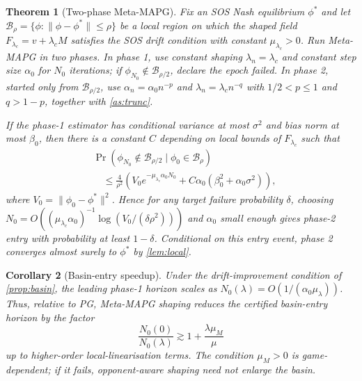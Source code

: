 \documentclass{article}
\theoremstyle{plain}
\newtheorem{theorem}{Theorem}[section]
\newtheorem{corollary}[theorem]{Corollary}
\theoremstyle{definition}
\theoremstyle{remark}
\newcommand{\B}{\mathcal{B}}
\begin{document}
\begin{theorem}[Two-phase Meta-MAPG]\label{thm:two-phase}
Fix an SOS Nash equilibrium $\phi^\ast$ and let $\B_\rho=\{\phi:\|\phi-\phi^\ast\|\le\rho\}$ be a local region on which the shaped field $F_{\lambda_c}=v+\lambda_c M$ satisfies the SOS drift condition with constant $\mu_{\lambda_c}>0$. Run Meta-MAPG in two phases. In phase 1, use constant shaping $\lambda_n=\lambda_c$ and constant step size $\alpha_0$ for $N_0$ iterations; if $\phi_{N_0}\notin\B_{\rho/2}$, declare the epoch failed. In phase 2, started only from $\B_{\rho/2}$, use $\alpha_n=\alpha_0 n^{-p}$ and $\lambda_n=\lambda_c n^{-q}$ with $1/2<p\le 1$ and $q>1-p$, together with \cref{as:trunc}.

If the phase-1 estimator has conditional variance at most $\sigma^2$ and bias norm at most $\beta_0$, then there is a constant $C$ depending on local bounds of $F_{\lambda_c}$ such that
\[
\begin{aligned}
&\Pr(\phi_{N_0}\notin \B_{\rho/2}\mid \phi_0\in\B_\rho)\\
&\quad\le
\frac{4}{\rho^2}\left(
V_0e^{-\mu_{\lambda_c}\alpha_0 N_0}
{}+C\alpha_0(\beta_0^2+\alpha_0\sigma^2)
\right),
\end{aligned}
\]
where $V_0=\|\phi_0-\phi^\ast\|^2$. Hence for any target failure probability $\delta$, choosing $N_0=O((\mu_{\lambda_c}\alpha_0)^{-1}\log(V_0/(\delta\rho^2)))$ and $\alpha_0$ small enough gives phase-2 entry with probability at least $1-\delta$. Conditional on this entry event, phase 2 converges almost surely to $\phi^\ast$ by \cref{lem:local}.
\end{theorem}

\begin{corollary}[Basin-entry speedup]\label{cor:speedup}
Under the drift-improvement condition of \cref{prop:basin}, the leading phase-1 horizon scales as $N_0(\lambda)=O(1/(\alpha_0\mu_\lambda))$. Thus, relative to PG, Meta-MAPG shaping reduces the certified basin-entry horizon by the factor
\[
\frac{N_0(0)}{N_0(\lambda)}
\gtrsim 1+\frac{\lambda\mu_M}{\mu}
\]
up to higher-order local-linearisation terms. The condition $\mu_M>0$ is game-dependent; if it fails, opponent-aware shaping need not enlarge the basin.
\end{corollary}
\end{document}
